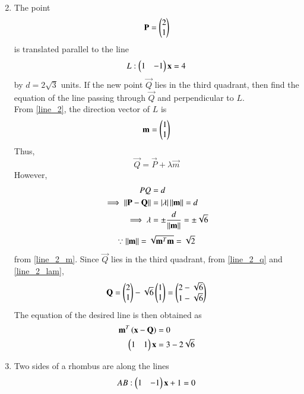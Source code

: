 \documentclass[journal,12pt,twocolumn]{IEEEtran}
\begin{document}
\begin{enumerate}[label=\arabic*]
\begin{align}
\end{align} 
\item The 
point 
\begin{equation} 
\mathbf{P}=\begin{pmatrix}2\\ 1\end{pmatrix} 
\end{equation} 
is translated parallel to the line 
\begin{equation} 
\label{line_2}
L: \begin{pmatrix}1 & -1\end{pmatrix}\mathbf{x} = 4 
\end{equation} 
% 
by $d =2\sqrt{3}$ units.  If the new point $\vec{Q}$ lies in the third 
quadrant, then find the equation of the line passing through $\vec{Q}$ and perpendicular to $L$. 
\\
\solution From \eqref{line_2}, the direction vector of $L$ is
\begin{equation} 
\label{line_2_m}
\mathbf{m} = \begin{pmatrix}1 \\ 1\end{pmatrix} 
\end{equation} 
Thus, 
\begin{equation} 
\label{line_2_q}
\vec{Q}= \vec{P} + \lambda \vec{m}
\end{equation} 
However, 
\begin{align} 
PQ &= d
\\
\implies\lVert\mathbf{P}- \mathbf{Q}\rVert &= \left\vert\lambda\right\vert\lVert\mathbf{m}\rVert =  d
\\
\implies \lambda &= \pm \frac{d}{\lVert\mathbf{m}\rVert} = \pm \sqrt{6}
\label{line_2_lam}
\end{align} 
%
\begin{align} 
\because \lVert\mathbf{m}\rVert = \sqrt{\mathbf{m}^T\mathbf{m}}= \sqrt{2}
\end{align} 
%
from \eqref{line_2_m}.  Since $\vec{Q}$ lies in the third quadrant, from \eqref{line_2_q} and \eqref{line_2_lam},
\begin{align} 
\mathbf{Q} = \begin{pmatrix}2\\ 1\end{pmatrix}  -  \sqrt{6}\begin{pmatrix}1\\ 1\end{pmatrix} =  \begin{pmatrix}2-\sqrt{6}\\ 1-\sqrt{6}\end{pmatrix}
\end{align} 
%
The equation of the desired line is then obtained as 
\begin{align} 
\label{line_2_final}
\mathbf{m}^T\left(\mathbf{x}-\mathbf{Q}\right)&= 0
\\
 \begin{pmatrix}1 & 1\end{pmatrix}\mathbf{x} &= 3 -2\sqrt{6}
\end{align} 
\item Two sides of a rhombus are along the lines
\begin{align}
\label{eq:lines_4_ab}
AB: \myvec{1 & -1}\vec{x} + 1 &=0
\\

\end{align}
\end{enumerate}
\end{document}
